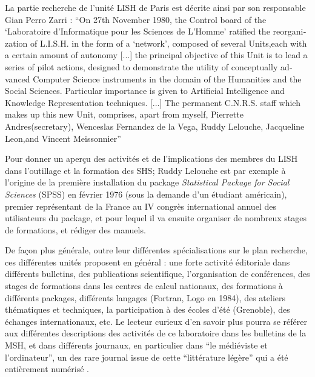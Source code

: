 La partie recherche de l'unité LISH de Paris est décrite ainsi par son responsable Gian Perro Zarri : \foreignquote{english}{On 27th November 1980, the Control board of the \enquote{Laboratoire d'Informatique pour les Sciences de L'Homme} ratified the reorganization of L.I.S.H. in the form of a \enquote{network}, composed of several Units,each with a certain amount of autonomy [...] the principal objective of this Unit is to lead a series of pilot actions, designed to demonstrate the utility of conceptually advanced Computer Science instruments in the domain of the Humanities and the Social Sciences. Particular importance is given to Artificial Intelligence and Knowledge Representation techniques. [...]  The permanent C.N.R.S. staff which makes up this new Unit, comprises, apart from myself, Pierrette Andres(secretary), Wenceslas Fernandez de la Vega, Ruddy Lelouche, Jacqueline Leon,and Vincent Meissonnier} \autocite{Zarri1981}

Pour donner un aperçu des activités et de l'implications des membres du LISH dans l'outillage et la formation des SHS; Ruddy Lelouche est par exemple à l'origine de la première installation du package \textit{Statistical Package for Social Sciences} (SPSS) en février 1976 (sous la demande d'un étudiant américain), premier représentant de la France au IV congrès international annuel des utilisateurs du package, et pour lequel il va ensuite organiser de nombreux stages de formations, et rédiger des manuels.

De façon plus générale, outre leur différentes spécialisations sur le plan recherche, ces différentes unités proposent en général : une forte activité éditoriale dans différents bulletins, des publications scientifique, l'organisation de conférences, des stages de formations dans les centres de calcul nationaux, des formations à différents packages, différents langages (Fortran, Logo en 1984), des ateliers thématiques et techniques, la participation à des écoles d'été (Grenoble), des échanges internationaux, etc. Le lecteur curieux d'en savoir plus pourra se référer aux différentes descriptions des activités de ce laboratoire dans les bulletins de la MSH, et dans différents journaux, en particulier dans \enquote{le médiéviste et l'ordinateur}, un des rare journal issue de cette \enquote{littérature légère} qui a été entièrement numérisé .

